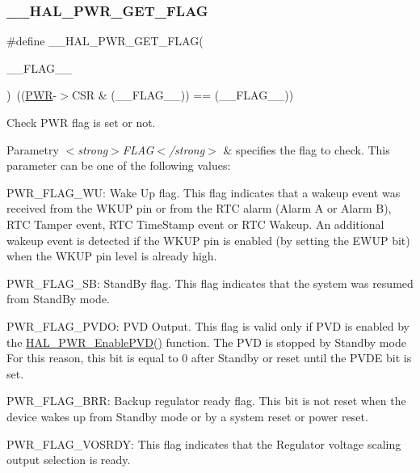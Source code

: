 \subsubsection{\texorpdfstring{\+\_\+\+\_\+\+H\+A\+L\+\_\+\+P\+W\+R\+\_\+\+G\+E\+T\+\_\+\+F\+L\+AG}{\_\_HAL\_PWR\_GET\_FLAG}}
{\footnotesize\ttfamily \#define \+\_\+\+\_\+\+H\+A\+L\+\_\+\+P\+W\+R\+\_\+\+G\+E\+T\+\_\+\+F\+L\+AG(\begin{DoxyParamCaption}\item[{}]{\+\_\+\+\_\+\+F\+L\+A\+G\+\_\+\+\_\+ }\end{DoxyParamCaption})~((\hyperlink{group___peripheral__declaration_ga04651c526497822a859942b928e57f8e}{P\+WR}-\/$>$C\+SR \& (\+\_\+\+\_\+\+F\+L\+A\+G\+\_\+\+\_\+)) == (\+\_\+\+\_\+\+F\+L\+A\+G\+\_\+\+\_\+))}



Check P\+WR flag is set or not. 


\begin{DoxyParams}{Parametry}
{\em $<$strong$>$\+F\+L\+A\+G$<$/strong$>$} & specifies the flag to check. This parameter can be one of the following values\+: \begin{DoxyItemize}
\item P\+W\+R\+\_\+\+F\+L\+A\+G\+\_\+\+WU\+: Wake Up flag. This flag indicates that a wakeup event was received from the W\+K\+UP pin or from the R\+TC alarm (Alarm A or Alarm B), R\+TC Tamper event, R\+TC Time\+Stamp event or R\+TC Wakeup. An additional wakeup event is detected if the W\+K\+UP pin is enabled (by setting the E\+W\+UP bit) when the W\+K\+UP pin level is already high. \item P\+W\+R\+\_\+\+F\+L\+A\+G\+\_\+\+SB\+: Stand\+By flag. This flag indicates that the system was resumed from Stand\+By mode. \item P\+W\+R\+\_\+\+F\+L\+A\+G\+\_\+\+P\+V\+DO\+: P\+VD Output. This flag is valid only if P\+VD is enabled by the \hyperlink{group___p_w_r___exported___functions___group2_ga729c254eac1847073d8a55621384107d}{H\+A\+L\+\_\+\+P\+W\+R\+\_\+\+Enable\+P\+V\+D()} function. The P\+VD is stopped by Standby mode For this reason, this bit is equal to 0 after Standby or reset until the P\+V\+DE bit is set. \item P\+W\+R\+\_\+\+F\+L\+A\+G\+\_\+\+B\+RR\+: Backup regulator ready flag. This bit is not reset when the device wakes up from Standby mode or by a system reset or power reset. \item P\+W\+R\+\_\+\+F\+L\+A\+G\+\_\+\+V\+O\+S\+R\+DY\+: This flag indicates that the Regulator voltage scaling output selection is ready. \end{DoxyItemize}
\\
\hline
\end{DoxyParams}

